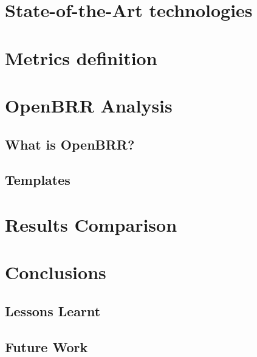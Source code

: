 \documentclass[a4paper,12pt]{book}
\begin{document}

\chapter{State-of-the-Art technologies}
\label{chap:tech}


\chapter{Metrics definition}
\label{chap:metrics}


\chapter{OpenBRR Analysis}
\label{chap:openbrr}

\section{What is OpenBRR?}
\label{sec:openbrr2}

\section{Templates}
\label{sec:templates}


\chapter{Results Comparison}
\label{chap:results}


\chapter{Conclusions}
\label{chap:conclusions}


\section{Lessons Learnt}
\label{sec:lessons}


\section{Future Work}
\label{sec:future}
\end{document}
